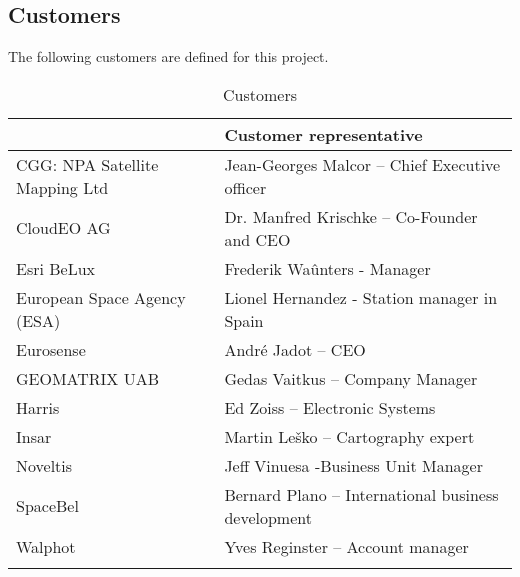 \subsection{Customers}



{The following customers are defined for this project.}
\begin{table}[H]
	\centering
	\caption{Customers}
	\label{my-label}
	\begin{tabular}{ll}
		\hline
		\rowcolor[HTML]{C0C0C0} 
		\multicolumn{1}{|l|}{\cellcolor[HTML]{C0C0C0}Customer group} & \multicolumn{1}{l|}{\cellcolor[HTML]{C0C0C0}Customer representative}    \\ \hline
		\multicolumn{1}{|l|}{CGG: NPA Satellite Mapping Ltd}         & \multicolumn{1}{l|}{Jean-Georges Malcor – Chief Executive officer}      \\ \hline
		\multicolumn{1}{|l|}{CloudEO AG}                             & \multicolumn{1}{l|}{Dr. Manfred Krischke – Co-Founder and CEO}          \\ \hline
		\multicolumn{1}{|l|}{Esri BeLux}                             & \multicolumn{1}{l|}{Frederik Waûnters - Manager}                        \\ \hline
		\multicolumn{1}{|l|}{European Space Agency (ESA)}            & \multicolumn{1}{l|}{Lionel Hernandez - Station manager in Spain}                                                   \\ \hline
		\multicolumn{1}{|l|}{Eurosense}                              & \multicolumn{1}{l|}{André Jadot – CEO}                                  \\ \hline
		\multicolumn{1}{|l|}{GEOMATRIX UAB}                          & \multicolumn{1}{l|}{Gedas Vaitkus – Company Manager}                    \\ \hline
		\multicolumn{1}{|l|}{Harris}                                 & \multicolumn{1}{l|}{Ed Zoiss – Electronic Systems}                      \\ \hline
		\multicolumn{1}{|l|}{Insar}                                  & \multicolumn{1}{l|}{Martin Leško – Cartography expert}                  \\ \hline
		\multicolumn{1}{|l|}{Noveltis}                               & \multicolumn{1}{l|}{Jeff Vinuesa -Business Unit Manager}                \\ \hline
		\multicolumn{1}{|l|}{SpaceBel}                               & \multicolumn{1}{l|}{Bernard Plano – International business development} \\ \hline
		\multicolumn{1}{|l|}{Walphot}                                & \multicolumn{1}{l|}{Yves Reginster – Account manager}                   \\ \hline
		&                                                                        
	\end{tabular}
\end{table}